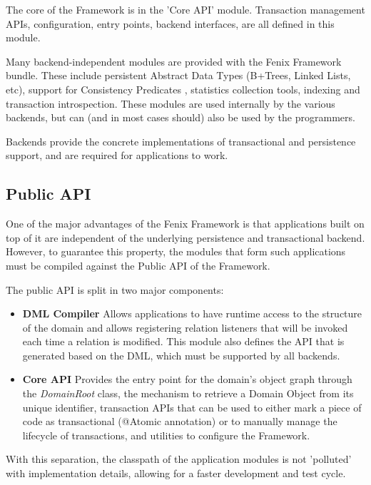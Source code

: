 The core of the Framework is in the 'Core API' module. Transaction
management APIs, configuration, entry points, backend interfaces, are
all defined in this module.

Many backend-independent modules are provided with the Fenix Framework
bundle. These include persistent Abstract Data Types (B+Trees, Linked
Lists, etc), support for Consistency
Predicates \cite{JoaoCoutinhoNeves2011}, statistics collection tools,
indexing and transaction introspection. These modules are used
internally by the various backends, but can (and in most cases should)
also be used by the programmers.

Backends provide the concrete implementations of transactional and
persistence support, and are required for applications to work.

\subsection{Public API}

One of the major advantages of the Fenix Framework is that
applications built on top of it are independent of the underlying
persistence and transactional backend. However, to guarantee this
property, the modules that form such applications must be compiled
against the Public API of the Framework.

The public API is split in two major components:

\begin{itemize}
\item {\bf DML Compiler} Allows applications to have runtime access to
  the structure of the domain and allows registering relation
  listeners that will be invoked each time a relation is
  modified. This module also defines the API that is generated based
  on the DML, which must be supported by all backends.

\item {\bf Core API} Provides the entry point for the domain's object
graph through the {\it DomainRoot} class, the mechanism to retrieve a
Domain Object from its unique identifier, transaction APIs that can be
used to either mark a piece of code as transactional (@Atomic
annotation) or to manually manage the lifecycle of transactions, and
utilities to configure the Framework.
\end{itemize}

With this separation, the classpath of the application modules is not
'polluted' with implementation details, allowing for a faster
development and test cycle.

